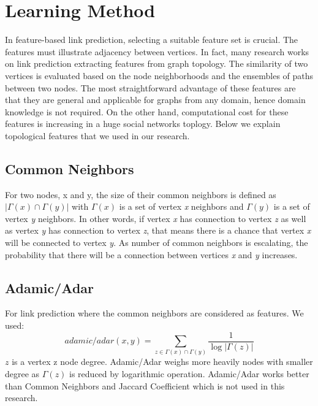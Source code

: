 \section{Learning Method}
In feature-based link prediction, selecting a suitable feature set is crucial. The features must illustrate adjacency between vertices. In fact, many research works on link prediction extracting features from graph topology. The similarity of two vertices is evaluated based on the node neighborhoods and the ensembles of paths between two nodes. The most straightforward advantage of these features are that they are general and applicable for graphs from any domain, hence domain knowledge is not required. On the other hand, computational cost for these features is increasing in a huge social networks toplogy. Below we explain topological features that we used in our research.

\subsection{Common Neighbors}
For two nodes, x and y, the size of their common neighbors is defined as $|\Gamma(x)\cap\Gamma(y)|$ with $\Gamma(x)$ is a set of vertex \textit{x} neighbors and $\Gamma(y)$ is a set of vertex \textit{y} neighbors. In other words, if vertex \textit{x} has connection to vertex \textit{z} as well as vertex \textit{y} has connection to vertex \textit{z}, that means there is a chance that vertex \textit{x} will be connected to vertex \textit{y}. As number of common neighbors is escalating, the probability that there will be a connection between vertices \textit{x} and \textit{y} increases.

\subsection{Adamic/Adar}
For link prediction where the common neighbors are considered as features. We used:
		\begin{equation}
		adamic/adar(x,y) = \sum_{z \in\Gamma(x)\cap\Gamma(y)} \frac{1}{\log|\Gamma(z)|}
		\end{equation}
$\textit{z}$ is a vertex z node degree. Adamic/Adar weighs more heavily nodes with smaller degree as $\Gamma(z)$ is reduced by logarithmic operation. Adamic/Adar works better than Common Neighbors and Jaccard Coefficient which is not used in this research.

